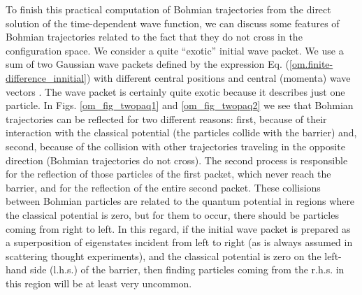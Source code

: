 \documentclass[onecolumn,nofootinbib, secnumarabic, amsmath, nobibnotes,11pt,aps,pra]{revtex4-1}
\newcommand{\eref}[1]{Eq. (\ref{#1})}
\begin{document}
To finish this practical computation of Bohmian trajectories from
the direct solution of the time-dependent wave function, we can
discuss some features of Bohmian trajectories related to the fact
that they do not cross in the configuration space. We consider a
quite ``exotic'' initial wave packet. We use a sum of two Gaussian
wave packets defined by the expression
\eref{om.finite-difference_innitial} with different central
positions and central (momenta) wave vectors \cite{om.oriolstime}.
The wave packet is certainly quite exotic because it describes just
one particle. In Figs. \ref{om_fig_twopaq1} and \ref{om_fig_twopaq2} we
see that Bohmian trajectories can be reflected for two different
reasons: first, because of their interaction with the classical
potential (the particles collide with the barrier) and, second,
because of the collision with other trajectories traveling in the
opposite direction (Bohmian trajectories do not cross). The second
process is responsible for the reflection of those particles of the
first packet, which never reach the barrier, and for the reflection
of the entire second packet. These collisions between Bohmian
particles are related to the quantum  potential
in regions where the classical potential is zero, but for them to
occur, there should be particles coming from right to left. In this
regard, if the initial wave packet is prepared as a superposition of
eigenstates incident from left to right (as is always assumed in
scattering thought experiments), and the classical potential is zero
on the left-hand side (l.h.s.) of the barrier, then finding
particles coming from the r.h.s. in this region will be at least
very uncommon.
\end{document}
